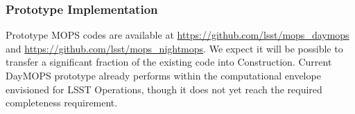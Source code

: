 \subsubsection{Prototype Implementation}

Prototype MOPS codes are available at
\url{https://github.com/lsst/mops_daymops} and
\url{https://github.com/lsst/mops_nightmops}. We expect it will be
possible to transfer a significant fraction of the existing code into
Construction. Current DayMOPS prototype already performs within the
computational envelope envisioned for LSST Operations, though it does
not yet reach the required completeness requirement.


